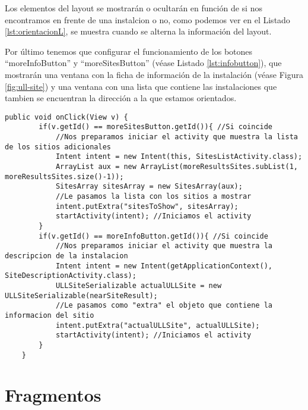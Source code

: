 

Los elementos del layout se mostrarán o ocultarán en función de si nos encontramos en frente de una instalcion o no, como podemos ver en el Listado \ref{lst:orientacionL}, se muestra cuando se alterna la información del layout.

Por último tenemos que configurar el funcionamiento de los botones ``moreInfoButton'' y ``moreSitesButton'' (véase Listado \ref{lst:infobutton}), que mostrarán una ventana con la ficha de información de la instalación (véase Figura \ref{fig:ull-site}) y una ventana con una lista que contiene las instalaciones que tambien se  encuentran la dirección a la que estamos orientados. 



\begin{lstlisting}[caption={Fichero \textit{ARNavigation.java}. Código para manejar los eventos de los botones.},  label={lst:infobutton}]
    public void onClick(View v) {
        if(v.getId() == moreSitesButton.getId()){ //Si coincide
            //Nos preparamos iniciar el activity que muestra la lista de los sitios adicionales
            Intent intent = new Intent(this, SitesListActivity.class);
            ArrayList aux = new ArrayList(moreResultsSites.subList(1, moreResultsSites.size()-1));
            SitesArray sitesArray = new SitesArray(aux);
            //Le pasamos la lista con los sitios a mostrar
            intent.putExtra("sitesToShow", sitesArray);
            startActivity(intent); //Iniciamos el activity
        }
        if(v.getId() == moreInfoButton.getId()){ //Si coincide
            //Nos preparamos iniciar el activity que muestra la descripcion de la instalacion
            Intent intent = new Intent(getApplicationContext(), SiteDescriptionActivity.class);
            ULLSiteSerializable actualULLSite = new ULLSiteSerializable(nearSiteResult);
            //Le pasamos como "extra" el objeto que contiene la informacion del sitio
            intent.putExtra("actualULLSite", actualULLSite);
            startActivity(intent); //Iniciamos el activity
        }
    }
\end{lstlisting}


\section{Fragmentos}

